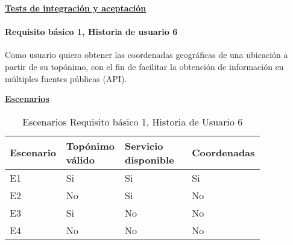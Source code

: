 \documentclass[../ei103948-project-documentation.tex]{subfiles}
\begin{document}
				\begin{center}
					\textbf{\underline{Tests de integración y aceptación}}
				\end{center}

				\testBasicoE

				\vspace*{5mm}


				\paragraph{Requisito básico 1, Historia de usuario 6}
				Como usuario quiero obtener las coordenadas geográficas de una ubicación a partir de su topónimo, con el fin de facilitar la obtención de información en múltiples fuentes públicas (API).

					\begin{center}
					\textbf{\underline{Escenarios}}
					\begin{table}[H]
						\centering
						\begin{tabular}{|p{0.14\linewidth}|p{0.22\linewidth}|p{0.26\linewidth}|p{0.22\linewidth}|}
							\hline
							\textbf{Escenario} & \textbf{Topónimo válido} & \textbf{Servicio disponible} & \textbf{Coordenadas} \\ \hline
							E1                 & Si                       & Si                           & Si                   \\ \hline
							E2                 & No                       & Si                           & No                   \\ \hline
							E3                 & Si                       & No                           & No                   \\ \hline
							E4                 & No                       & No                           & No                   \\ \hline
							\end{tabular}
						\caption{Escenarios Requisito básico 1, Historia de Usuario 6}
					\end{table}

					\descripcionBasicaF

					\newpage


\end{center}
\end{document}
